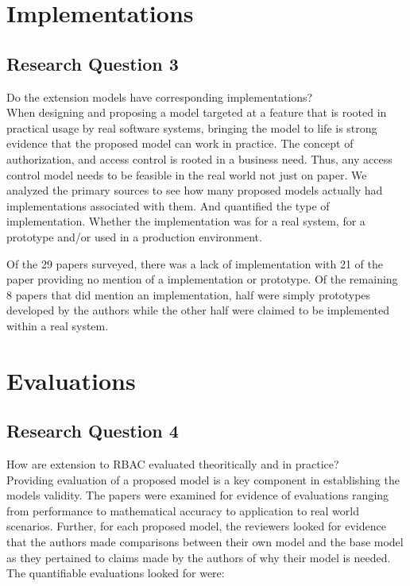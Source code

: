 \section{Implementations} \label{sec:implementations}

\subsection{Research Question 3}

Do the extension models have corresponding implementations? \\

When designing and proposing a model targeted at a feature that is rooted in practical
usage by real software systems, bringing the model to life is strong evidence that the
proposed model can work in practice.  The concept of authorization, and access control
is rooted in a business need.  Thus, any access control model needs to be feasible
in the real world not just on paper.  We analyzed the primary sources to see how many
proposed models actually had implementations associated with them.  And quantified the
type of implementation.  Whether the implementation was for a real system, for a prototype
and/or used in a production environment.

Of the 29 papers surveyed, there was a lack of implementation with 21 of the paper providing no
mention of a implementation or prototype.  Of the remaining 8 papers that did mention an implementation, half 
were simply prototypes developed by the authors while the other half were claimed to be implemented within a real
system.


\section{Evaluations} \label{sec:evaluations}

\subsection{Research Question 4}

How are extension to RBAC evaluated theoritically and in practice? \\

Providing evaluation of a proposed model is a key component in establishing the models validity.  The papers were examined
for evidence of evaluations ranging from performance to mathematical accuracy to application to real world scenarios.  Further,
for each proposed model, the reviewers looked for evidence that the authors made comparisons between their own model and the base
model as they pertained to claims made by the authors of why their model is needed.  The quantifiable evaluations looked for were:

